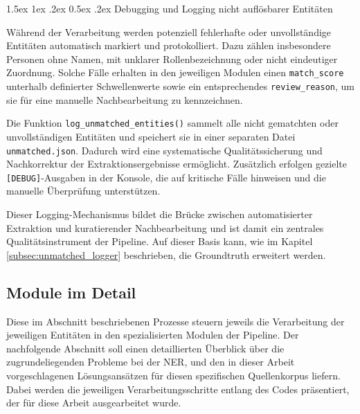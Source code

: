 \documentclass[12pt, a4paper, ngerman, bidi=default]{article}
\makeatletter
\newcommand{\code}[1]{\colorbox{VeryLightGray}{\texttt{#1}}} %
\let\oldparagraph\paragraph%
\renewcommand{\paragraph}{
    \@ifstar%
      \xxxParagraphStar%
      \xxxParagraphNoStar%
 }
\newcommand{\xxxParagraphStar}[1]{\oldparagraph*{#1}\mbox{}}
\newcommand{\xxxParagraphNoStar}[1]{\oldparagraph{#1}\mbox{}}
\renewcommand\paragraph{\@startsection{paragraph}{4}{0em}%
  {1.5ex \@plus1ex \@minus.2ex}%
  {0.5ex \@plus.2ex}%
  {\normalfont\normalsize\bfseries\itshape}}
\makeatother
\begin{document}
\paragraph{Debugging und Logging nicht auflösbarer Entitäten}

Während der Verarbeitung werden potenziell fehlerhafte oder unvollständige Entitäten automatisch markiert und protokolliert. Dazu zählen insbesondere Personen ohne Namen, mit unklarer Rollenbezeichnung oder nicht eindeutiger Zuordnung. Solche Fälle erhalten in den jeweiligen Modulen einen \code{match\_score} unterhalb definierter Schwellenwerte sowie ein entsprechendes \code{review\_reason}, um sie für eine manuelle Nachbearbeitung zu kennzeichnen.

Die Funktion \code{log\_unmatched\_entities()} sammelt alle nicht gematchten oder unvollständigen Entitäten und speichert sie in einer separaten Datei \code{unmatched.json}. Dadurch wird eine systematische Qualitätssicherung und Nachkorrektur der Extraktionsergebnisse ermöglicht. Zusätzlich erfolgen gezielte \code{[DEBUG]}-Ausgaben in der Konsole, die auf kritische Fälle hinweisen und die manuelle Überprüfung unterstützen.

Dieser Logging-Mechanismus bildet die Brücke zwischen automatisierter Extraktion und kuratierender Nachbearbeitung und ist damit ein zentrales Qualitätsinstrument der Pipeline. Auf dieser Basis kann, wie im Kapitel \ref{subsec:unmatched_logger} beschrieben, die Groundtruth erweitert werden.



\subsection{Module im Detail}\label{subsec:Module_im_Detail}

Diese im Abschnitt beschriebenen Prozesse steuern jeweils die Verarbeitung der jeweiligen Entitäten in den spezialisierten Modulen der Pipeline. Der nachfolgende Abschnitt soll einen detaillierten Überblick über die zugrundeliegenden Probleme bei der NER, und den in dieser Arbeit vorgeschlagenen Lösungsansätzen für diesen spezifischen Quellenkorpus liefern. Dabei werden die jeweiligen Verarbeitungsschritte entlang des Codes präsentiert, der für diese Arbeit ausgearbeitet wurde. 
\end{document}
